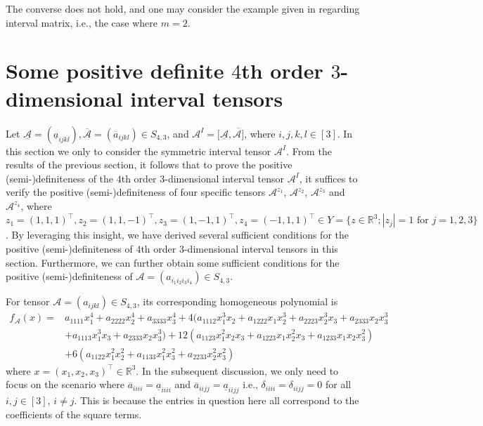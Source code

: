 \documentclass[twoside]{article}
\begin{document}
The converse does not hold, and one may consider the example given in \cite{rohn1994} regarding interval matrix, i.e., the case where  $m=2$.

\vspace{.3cm}

\section{Some positive definite $4$th order $3$-dimensional interval tensors}
\setcounter{section}{5}
Let $\underline{\mathcal{A}}=(\underline{a}_{ijkl}), \overline{\mathcal{A}}=(\overline{a}_{ijkl})\in S_{4,3}$, and ${\mathcal{A}}^I=[\underline{\mathcal{A}},\overline{\mathcal{A}]}$, where $i,j,k,l\in[3]$. In this section we only to consider the symmetric interval tensor ${\mathcal{A}}^I$. From the results of the previous section, it follows that to prove the positive (semi-)definiteness of the $4$th order $3$-dimensional interval tensor  ${\mathcal{A}}^I$, it suffices to verify the positive (semi-)definiteness of four specific tensors $\mathcal{A}^{z_1}$, $\mathcal{A}^{z_2}$, $\mathcal{A}^{z_3}$ and $\mathcal{A}^{z_4}$, where $z_1=(1,1,1)^{\top},z_2=(1,1,-1)^{\top},z_3=(1,-1,1)^{\top},z_4=(-1,1,1)^{\top}\in Y=\{z\in \mathbb{R}^3; |z_j|=1 \mbox{ for } j=1,2,3\}$. By leveraging this insight, we have derived several sufficient conditions for the positive (semi-)definiteness of $4$th order $3$-dimensional interval tensors in this section.
Furthermore, we can further obtain some sufficient conditions for the positive (semi-)definiteness of ${\mathcal{A}}=(a_{i_1i_2i_3i_4})\in S_{4,3}$.

For tensor ${\mathcal{A}}=(a_{ijkl})\in S_{4,3}$, its corresponding homogeneous polynomial is
\begin{align*}
  f_{\mathcal{A}}(x) =& a_{1111}x_1^4+a_{2222}x_2^4+a_{3333}x_3^4+4(a_{1112}x_1^3x_2+a_{1222}x_1x_2^3+a_{2223}x_2^3x_3+a_{2333}x_2x_3^3\\
  &+a_{1113}x_1^3x_3+a_{2333}x_2x_3^3)+12(a_{1123}x_1^2x_2x_3+a_{1223}x_1x_2^2x_3+a_{1233}x_1x_2x_3^2)\\
  &+6(a_{1122}x_1^2x_2^2+a_{1133}x_1^2x_3^2+a_{2233}x_2^2x_3^2)
\end{align*}
where $x=(x_1,x_2,x_3)^{\top}\in\mathbb{R}^3$. In the subsequent discussion, we only need to focus on the scenario where $\overline{a}_{iiii}=\underline{a}_{iiii}$ and $\overline{a}_{iijj}=\underline{a}_{iijj}$ i.e., $\delta_{iiii}=\delta_{iijj}=0$ for all $i,j\in[3]$, $i\neq j$. This is because the entries in question here all correspond to the coefficients of the square terms.
\end{document}
